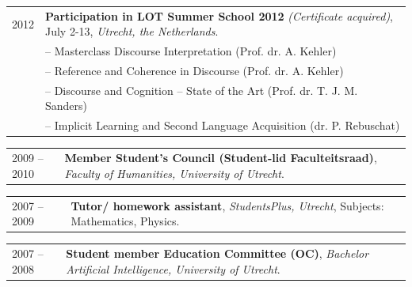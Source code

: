 \documentclass[a4paper,10pt]{article}
\def\leftcolwidth{.12\textwidth}
\def\tablevspace{10pt}
\begin{document}
\vspace{\tablevspace}

\noindent
\begin{tabularx}{\textwidth}{ p{\leftcolwidth} X }
  2012 & \textbf{Participation in LOT Summer School 2012} 
         \textit{(Certificate acquired)}, July 2-13,
         \textit{Utrecht, the Netherlands}.\\
       & -- {Masterclass Discourse Interpretation} (Prof. dr. A. Kehler)\\
       & -- {Reference and Coherence in Discourse} (Prof. dr. A. Kehler)\\
       & -- {Discourse and Cognition -- State of the Art} (Prof. dr. T. J. M. Sanders)\\
       & -- {Implicit Learning and Second Language Acquisition}
         (dr. P. Rebuschat)\\
\end{tabularx}

\vspace{\tablevspace}

\noindent
\begin{tabularx}{\textwidth}{ p{\leftcolwidth} X }
  2009 -- 2010
  & \textbf{Member Student's Council (Student-lid Faculteitsraad)},
    \textit{Faculty of Humanities, University of Utrecht}.\\
\end{tabularx}

\vspace{\tablevspace}

%

\noindent
\begin{tabularx}{\textwidth}{ p{\leftcolwidth} X }
  2007 -- 2009
  & \textbf{Tutor/ homework assistant}, \textit{StudentsPlus, Utrecht},
  Subjects: Mathematics, Physics.
\end{tabularx}

\vspace{\tablevspace}

\noindent
\begin{tabularx}{\textwidth}{ p{\leftcolwidth} X }
  2007 -- 2008
  & \textbf{Student member Education Committee (OC)},
    \textit{Bachelor Artificial Intelligence, University of Utrecht}.\\
\end{tabularx}
\end{document}
